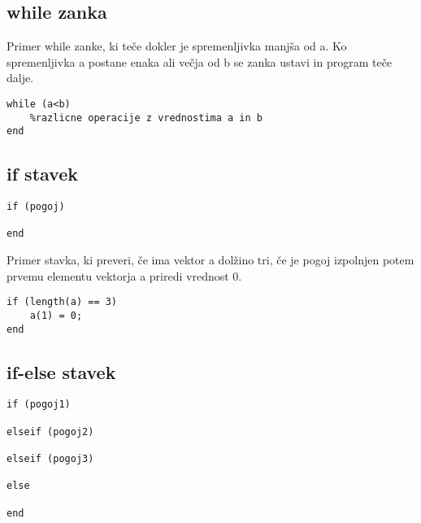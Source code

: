 \subsection{while zanka}

Primer while zanke, ki teče dokler je spremenljivka manjša od a. Ko spremenljivka a postane enaka ali večja od b se zanka ustavi in program teče dalje.
\vspace{-0.5cm}
\begin{lstlisting}
while (a<b)
	%razlicne operacije z vrednostima a in b
end
\end{lstlisting}
\vspace{0.2cm}

\subsection{if stavek}

\vspace{-0.5cm}
\begin{lstlisting}
if (pogoj)

end
\end{lstlisting}
\vspace{0.2cm}

Primer stavka, ki preveri, če ima vektor a dolžino tri, če je pogoj izpolnjen potem prvemu elementu vektorja a priredi vrednost 0.
\vspace{-0.5cm}
\begin{lstlisting}
if (length(a) == 3)
	a(1) = 0;
end
\end{lstlisting}
\vspace{0.2cm}


\subsection{if-else stavek}

\vspace{-0.5cm}
\begin{lstlisting}
if (pogoj1)

elseif (pogoj2)

elseif (pogoj3)

else

end
\end{lstlisting}
\vspace{0.2cm}







			
